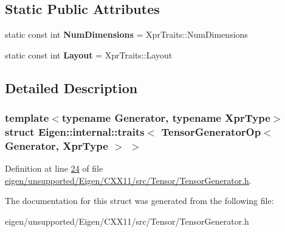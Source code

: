 \subsection*{Static Public Attributes}
\begin{DoxyCompactItemize}
\item 
\mbox{\label{struct_eigen_1_1internal_1_1traits_3_01_tensor_generator_op_3_01_generator_00_01_xpr_type_01_4_01_4_ace84b03e003b413638fb943c24536cd1}} 
static const int {\bfseries Num\+Dimensions} = Xpr\+Traits\+::\+Num\+Dimensions
\item 
\mbox{\label{struct_eigen_1_1internal_1_1traits_3_01_tensor_generator_op_3_01_generator_00_01_xpr_type_01_4_01_4_a74e4ab235e08da99d7bb3ae7d65b529d}} 
static const int {\bfseries Layout} = Xpr\+Traits\+::\+Layout
\end{DoxyCompactItemize}


\subsection{Detailed Description}
\subsubsection*{template$<$typename Generator, typename Xpr\+Type$>$\newline
struct Eigen\+::internal\+::traits$<$ Tensor\+Generator\+Op$<$ Generator, Xpr\+Type $>$ $>$}



Definition at line \hyperlink{eigen_2unsupported_2_eigen_2_c_x_x11_2src_2_tensor_2_tensor_generator_8h_source_l00024}{24} of file \hyperlink{eigen_2unsupported_2_eigen_2_c_x_x11_2src_2_tensor_2_tensor_generator_8h_source}{eigen/unsupported/\+Eigen/\+C\+X\+X11/src/\+Tensor/\+Tensor\+Generator.\+h}.



The documentation for this struct was generated from the following file\+:\begin{DoxyCompactItemize}
\item 
eigen/unsupported/\+Eigen/\+C\+X\+X11/src/\+Tensor/\+Tensor\+Generator.\+h\end{DoxyCompactItemize}
